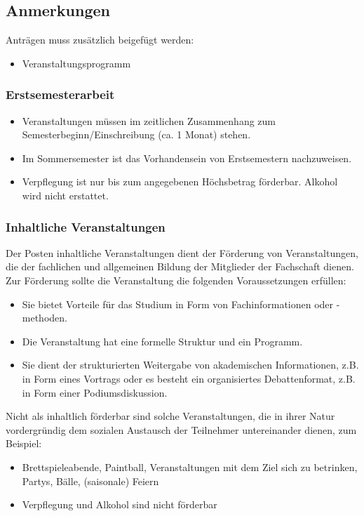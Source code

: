 \documentclass{article}
\begin{document}
    \subsection{Anmerkungen}
    Anträgen muss zusätzlich beigefügt werden:
    \begin{itemize}
        \item Veranstaltungsprogramm
    \end{itemize}
        \subsubsection{Erstsemesterarbeit}
        \begin{itemize}
            \item Veranstaltungen müssen im zeitlichen Zusammenhang zum Semesterbeginn/Einschreibung (ca. 1 Monat) stehen.
            \item Im Sommersemester ist das Vorhandensein von Erstsemestern nachzuweisen.
            \item Verpflegung ist nur bis zum angegebenen Höchsbetrag förderbar. Alkohol wird nicht erstattet.
        \end{itemize}
        
        \subsubsection{Inhaltliche Veranstaltungen}   
        Der Posten inhaltliche Veranstaltungen dient der Förderung von Veranstaltungen, die der fachlichen und allgemeinen Bildung der Mitglieder der Fachschaft dienen.
        Zur Förderung sollte die Veranstaltung die folgenden Voraussetzungen erfüllen:
        \begin{itemize}
            \item Sie bietet Vorteile für das Studium in Form von Fachinformationen oder -methoden.
            \item Die Veranstaltung hat eine formelle Struktur und ein Programm.
            \item Sie dient der strukturierten Weitergabe von akademischen Informationen, z.B. in Form eines Vortrags oder es besteht ein organisiertes Debattenformat, z.B. in Form einer Podiumsdiskussion.
        \end{itemize}

        Nicht als inhaltlich förderbar sind solche Veranstaltungen, die in ihrer Natur vordergründig dem sozialen Austausch der Teilnehmer untereinander dienen, zum Beispiel:
        \begin{itemize}
            \item Brettspieleabende,
            Paintball,
            Veranstaltungen mit dem Ziel sich zu betrinken,
            Partys,
            Bälle,
            (saisonale) Feiern
            \item Verpflegung und Alkohol sind nicht förderbar
        \end{itemize}
        
\end{document}
